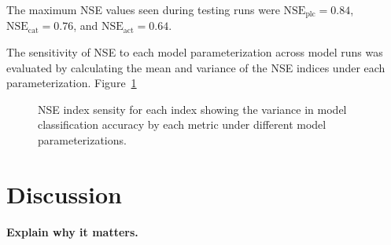 The maximum NSE values seen during testing runs were 
$\text{NSE}_\text{plc}=0.84$,
$\text{NSE}_\text{cat}=0.76$, and
$\text{NSE}_\text{act}=0.64$.

The sensitivity of NSE to each model parameterization across model
runs was evaluated by calculating the mean and variance of the NSE indices
under each parameterization. Figure~\ref{fig:land_nse}

\begin{figure}
    \centering
    \hfill
    \hfill
    \caption{NSE index sensity for each index showing the variance in
    model classification accuracy by each metric under different model
    parameterizations.}
    \label{fig:land_nse}
\end{figure}

\section{Discussion}
\label{sec:land_disc}

\textbf{Explain why it matters.}

